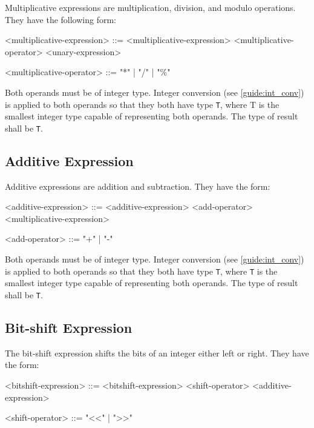 Multiplicative expressions are multiplication, division, and modulo operations. They have the following form:

\begin{minip}
\begin{grammar}
<multiplicative-expression> ::= <multiplicative-expression> 
<multiplicative-operator> <unary-expression>

<multiplicative-operator> ::= "*" | "/" | "\%"
\end{grammar}
\end{minip}

Both operands must be of integer type. Integer conversion (see \ref{guide:int_conv}) is applied to both operands so that they both have type \texttt{T}, where T is the smallest integer type capable of representing both operands. The type of result shall be \texttt{T}. 

\subsection{Additive Expression} \label{guide:add_expr}

Additive expressions are addition and subtraction. They have the form: 

\begin{minip}
\begin{grammar}
<additive-expression> ::= <additive-expression> 
<add-operator> <multiplicative-expression>

<add-operator> ::= "+" | "-"
\end{grammar}
\end{minip}

Both operands must be of integer type. Integer conversion (see \ref{guide:int_conv}) is applied to both operands so that they both have type \texttt{T}, where \texttt{T} is the smallest integer type capable of representing both operands. The type of result shall be \texttt{T}.

\subsection{Bit-shift Expression} \label{guide:bitshift_expr}

The bit-shift expression shifts the bits of an integer either left or right. They have the form:

\begin{minip}
\begin{grammar}
<bitshift-expression> ::= <bitshift-expression> 
<shift-operator> <additive-expression>

<shift-operator> ::= "<<" | ">>"
\end{grammar}
\end{minip}

